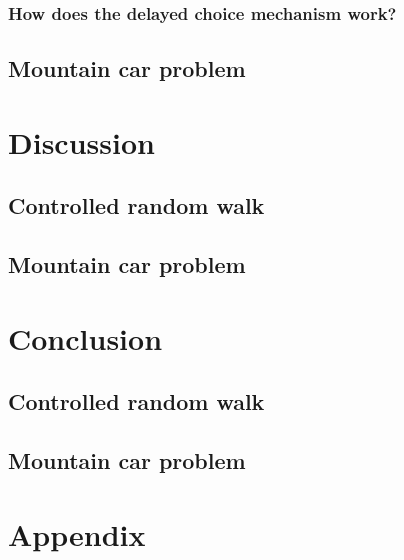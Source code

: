 \documentclass[10pt,a4paper]{article}
\begin{document}
\subsubsection{How does the delayed choice mechanism work?}

\subsection{Mountain car problem}

\section{Discussion}
\subsection{Controlled random walk}
\subsection{Mountain car problem}

\section{Conclusion}
\subsection{Controlled random walk}
\subsection{Mountain car problem}

\newpage
\section{Appendix}
\end{document}
